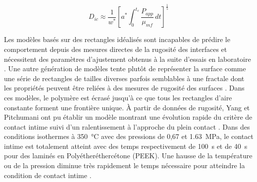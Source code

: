 \begin{equation}
D_{ic} \approx \frac{1}{w^*} \left[ a^* \int_{0}^{t_c} \frac{P_{app}}{\mu _{mf}} \, dt \right]^{\frac{1}{5}}
\label{eq:contact_intime}
\end{equation}

Les modèles basés sur des rectangles idéalisés sont incapables de prédire le comportement depuis des mesures directes de la rugosité des interfaces et nécessitent des paramètres d'ajustement obtenus à la suite d'essais en laboratoire \cite{Yang2001}. 
Une autre génération de modèles tente plutôt de représenter la surface comme une série de rectangles de tailles diverses parfois semblables à une fractale dont les propriétés peuvent être reliées à des mesures de rugosité des surfaces \cite{Yang2001,Yang2002}. 
Dans ces modèles, le polymère est écrasé jusqu'à ce que tous les rectangles d'aire constante forment une frontière unique. 
À partir de données de rugosité, Yang et Pitchumani ont pu établir un modèle montrant une évolution rapide du critère de contact intime suivi d'un ralentissement à l'approche du plein contact \cite{Yang2001}. 
Dans des conditions isothermes à \SI[locale=FR]{350}{\celsius} avec des pressions de 0,67 et \SI[locale=FR]{1,63}{\mega\pascal}, le contact intime est totalement atteint avec des temps respectivement de \SI[locale=FR]{100}{\second} et de \SI[locale=FR]{40}{\second} pour des laminés en Polyétheréthercétone (PEEK). 
Une hausse de la température ou de la pression diminue très rapidement le temps nécessaire pour atteindre la condition de contact intime \cite{Yang2002}. 

